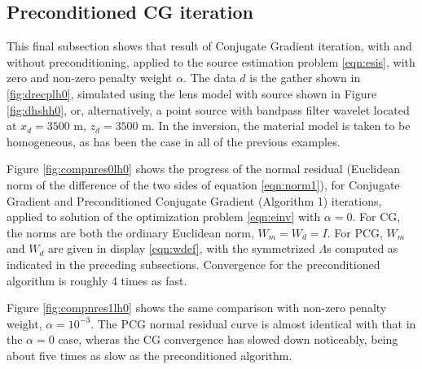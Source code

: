 \subsection{Preconditioned CG iteration}
This final subsection shows that result of Conjugate Gradient
iteration, with and without preconditioning, applied to the source
estimation problem \ref{eqn:esis}, with zero and non-zero penalty
weight $\alpha$. The data $d$ is the gather shown in
\ref{fig:drecplh0}, simulated using the lens model with source shown
in Figure \ref{fig:dhshh0}, or, alternatively, a point source with
bandpass filter wavelet located at $x_d=3500$ m, $z_d=3500$ m. In the inversion,
the material model is taken to be homogeneous, as has been the case in
all of the previous examples. 

Figure \ref{fig:compnres0lh0} shows the progress of the normal residual
(Euclidean norm of the difference of the two sides of equation \ref{eqn:norm1}),
for Conjugate Gradient and Preconditioned Conjugate Gradient
(Algorithm 1) iterations, applied to solution of the optimization
problem \ref{eqn:einv} with $\alpha=0$. For CG, the norms are both the ordinary
Euclidean norm, $W_m=W_d=I$. For PCG, $W_m$ and $W_d$ are given in
display \ref{eqn:wdef}, with the symmetrized $\Lambda$s computed as
indicated in the preceding subsections. Convergence for the
preconditioned algorithm is roughly 4 times as fast.


Figure \ref{fig:compnres1lh0} shows the same comparison with non-zero
penalty weight, $\alpha=10^{-3}$. The PCG normal residual curve is
almost identical with that in the $\alpha=0$ case, wheras the CG
convergence has slowed down noticeably, being about five times as slow
as the preconditioned algorithm.

